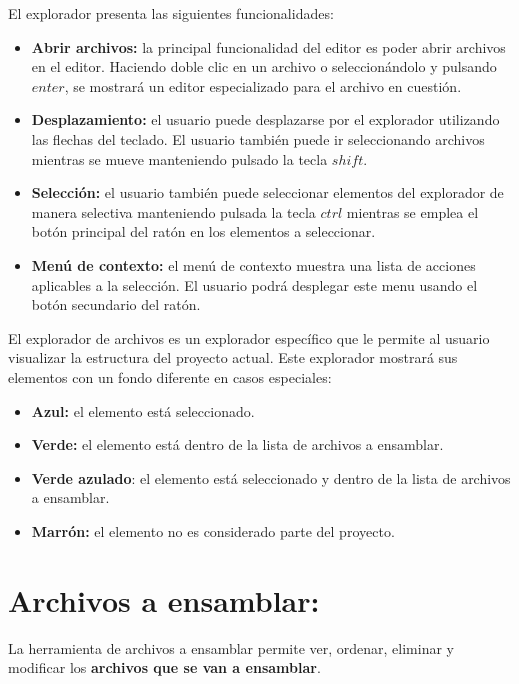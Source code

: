 El explorador presenta las siguientes funcionalidades:
\begin{itemize}
    \item \textbf{Abrir archivos:} la principal funcionalidad del editor
    es poder abrir archivos en el editor.
    Haciendo doble clic en un archivo o seleccionándolo y pulsando
    $enter$, se mostrará un editor especializado para el archivo
    en cuestión.
    \item \textbf{Desplazamiento:} el usuario puede desplazarse por el
    explorador utilizando las flechas del teclado.
    El usuario también puede ir seleccionando archivos mientras se
    mueve manteniendo pulsado la tecla $shift$.
    \item \textbf{Selección:} el usuario también puede seleccionar
    elementos del explorador de manera selectiva manteniendo
    pulsada la tecla $ctrl$ mientras se emplea el botón principal
    del ratón en los elementos a seleccionar.
    \item \textbf{Menú de contexto:} el menú de contexto muestra
    una lista de acciones aplicables a la selección.
    El usuario podrá desplegar este menu usando el botón secundario
    del ratón.
\end{itemize}

El explorador de archivos es un explorador específico
que le permite al usuario visualizar la estructura del proyecto
actual.
Este explorador mostrará sus elementos con un fondo diferente en
casos especiales:
\begin{itemize}
    \item \textbf{Azul:} el elemento está seleccionado.
    \item \textbf{Verde:} el elemento está dentro de la lista de
    archivos a ensamblar.
    \item \textbf{Verde azulado}: el elemento está seleccionado y
    dentro de la lista de archivos a ensamblar.
    \item \textbf{Marrón:} el elemento no es considerado
    parte del proyecto.
\end{itemize}


\section{Archivos a ensamblar:}\label{sec:archivos-a-ensamblar:}

La herramienta de archivos a ensamblar permite
ver, ordenar, eliminar y modificar los \textbf{archivos que se van a ensamblar}.


